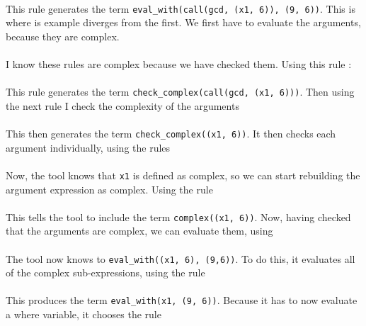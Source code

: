 
\mbox{} \\
This rule generates the term \lstinline{eval_with(call(gcd, (x1, 6)), (9, 6))}. This is where is example diverges from the first. We first have to evaluate the arguments, because they are complex. \\ \\%
I know these rules are complex because we have checked them. Using this rule : \\


\mbox{} \\
This rule generates the term \lstinline{check_complex(call(gcd, (x1, 6)))}. Then using the next rule I check the complexity of the arguments \\ %


\mbox{} \\
This then generates the term \lstinline{check_complex((x1, 6))}. It then checks each argument individually, using the rules  \\ %


\mbox{} \\
Now, the tool knows that \lstinline{x1} is defined as complex, so we can start rebuilding the argument expression as complex. Using the rule  \\ %


\mbox{} \\
This tells the tool to include the term \lstinline{complex((x1, 6))}. Now, having checked that the arguments are complex, we can evaluate them, using \\ %


\mbox{} \\
The tool now knows to \lstinline{eval_with((x1, 6), (9,6))}. To do this, it evaluates all of the complex sub-expressions, using the rule \\ %


\mbox{} \\
This produces the term \lstinline{eval_with(x1, (9, 6))}. Because it has to now evaluate a where variable, it chooses the rule \\ %

